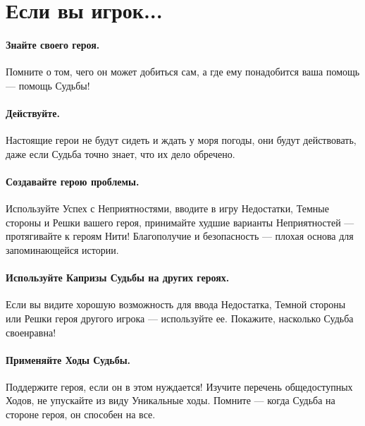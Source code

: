 \section*{Если вы игрок...}

\paragraph{Знайте своего героя.} Помните о том, чего он может добиться сам, а где ему понадобится ваша помощь — помощь Судьбы!
\paragraph{Действуйте.} Настоящие герои не будут сидеть и ждать у моря погоды, они будут действовать, даже если Судьба точно знает, что их дело обречено.
\paragraph{Создавайте герою проблемы.} Используйте Успех с Неприятностями, вводите в игру Недостатки, Темные стороны и Решки вашего героя, принимайте худшие варианты Неприятностей — протягивайте к героям Нити! Благополучие и безопасность — плохая основа для запоминающейся истории.
\paragraph{Используйте Капризы Судьбы на других героях.} Если вы видите хорошую возможность для ввода Недостатка, Темной стороны или Решки героя другого игрока — используйте ее. Покажите, насколько Судьба своенравна!
\paragraph{Применяйте Ходы Судьбы.} Поддержите героя, если он в этом нуждается! Изучите перечень общедоступных Ходов, не упускайте из виду Уникальные ходы. Помните — когда Судьба на стороне героя, он способен на все.